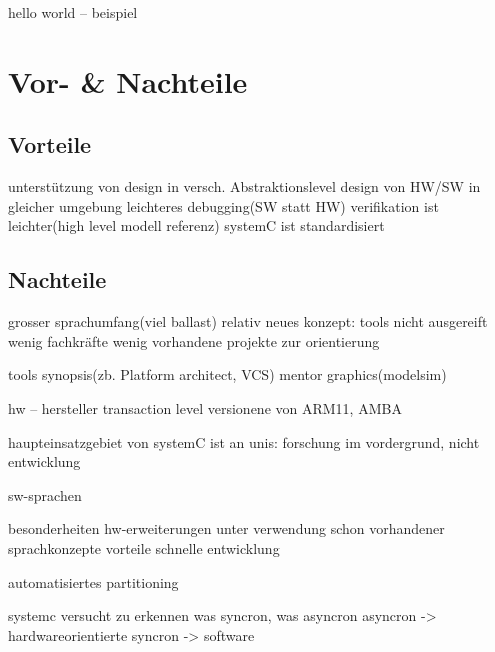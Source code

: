 	hello world – beispiel
	

\section{Vor- \& Nachteile}
\subsection{Vorteile}
		unterstützung von design in versch. Abstraktionslevel
		design von HW/SW in gleicher umgebung
		leichteres debugging(SW statt HW)
		verifikation ist leichter(high level modell referenz)
		systemC ist standardisiert

\subsection{Nachteile}
		grosser sprachumfang(viel ballast)
		relativ neues konzept:
tools nicht ausgereift
wenig fachkräfte
wenig vorhandene projekte zur orientierung

	tools
synopsis(zb. Platform architect, VCS)
mentor graphics(modelsim)
	
	hw – hersteller
transaction level versionene von ARM11, AMBA

	haupteinsatzgebiet von systemC ist an unis: forschung im vordergrund, nicht entwicklung
	
sw-sprachen

	besonderheiten
		hw-erweiterungen unter verwendung schon vorhandener sprachkonzepte
	vorteile
		schnelle entwicklung

	automatisiertes partitioning

	systemc versucht zu erkennen was syncron, was asyncron
		asyncron -> hardwareorientierte
		syncron -> software 
